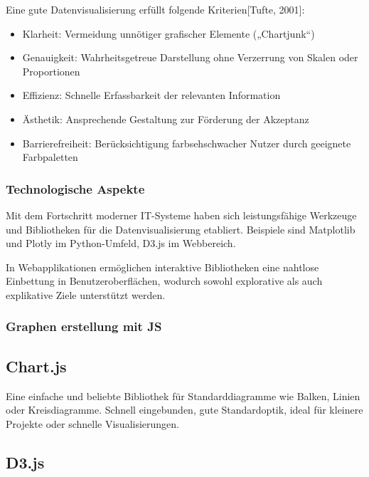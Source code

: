 Eine gute Datenvisualisierung erfüllt folgende Kriterien[Tufte, 2001]:


\begin{itemize}

\item
Klarheit: Vermeidung unnötiger grafischer Elemente („Chartjunk“)
\item
Genauigkeit: Wahrheitsgetreue Darstellung ohne Verzerrung von Skalen oder Proportionen
\item
Effizienz: Schnelle Erfassbarkeit der relevanten Information
\item
Ästhetik: Ansprechende Gestaltung zur Förderung der Akzeptanz
\item
Barrierefreiheit: Berücksichtigung farbsehschwacher Nutzer durch geeignete Farbpaletten

\end{itemize}

\subsubsection{Technologische Aspekte}

Mit dem Fortschritt moderner IT-Systeme haben sich leistungsfähige Werkzeuge und Bibliotheken für die
Datenvisualisierung etabliert.
Beispiele sind Matplotlib und Plotly im Python-Umfeld, D3.js im Webbereich.

In Webapplikationen ermöglichen interaktive Bibliotheken eine nahtlose Einbettung in Benutzeroberflächen,
wodurch sowohl explorative als auch explikative Ziele unterstützt werden.

\subsubsection{Graphen erstellung mit JS}


\subsection*{Chart.js}

Eine einfache und beliebte Bibliothek für Standarddiagramme wie Balken, Linien oder Kreisdiagramme. Schnell eingebunden, gute Standardoptik, ideal für kleinere Projekte oder schnelle Visualisierungen.



\subsection*{D3.js}

